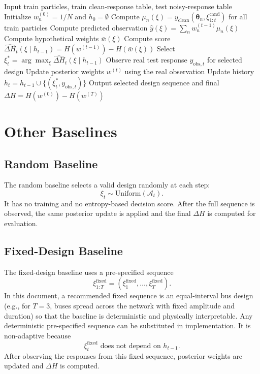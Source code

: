\documentclass[11pt]{article}
\newcommand{\thetaVec}{\bm{\theta}}
\newcommand{\Aset}{\mathcal{A}}
\begin{document}
\begin{algorithm}[H]
\caption{Myopic Entropy-Reduction Baseline}
\begin{algorithmic}[1]
\State Input train particles, train clean-response table, test noisy-response table
\State Initialize $w_n^{(0)}=1/N$ and $h_0=\emptyset$
    \For{each feasible candidate design $\xi\in\Aset_t$}
        \State Compute $\mu_n(\xi)=y_{\mathrm{clean}}(\thetaVec_n,\xi_{1:t}^{\mathrm{cand}})$ for all train particles
        \State Compute predicted observation $\hat y(\xi)=\sum_n w_n^{(t-1)}\mu_n(\xi)$
        \State Compute hypothetical weights $\bar w(\xi)$
        \State Compute score $\widehat{\Delta H}_t(\xi\mid h_{t-1})=H(w^{(t-1)})-H(\bar w(\xi))$
    \EndFor
    \State Select $\xi_t^*=\arg\max_{\xi}\widehat{\Delta H}_t(\xi\mid h_{t-1})$
    \State Observe real test response $y_{\mathrm{obs},t}$ for selected design
    \State Update posterior weights $w^{(t)}$ using the real observation
    \State Update history $h_t=h_{t-1}\cup\{(\xi_t^*,y_{\mathrm{obs},t})\}$
\EndFor
\State Output selected design sequence and final $\Delta H=H(w^{(0)})-H(w^{(T)})$
\end{algorithmic}
\end{algorithm}

\section{Other Baselines}

\subsection{Random Baseline}

The random baseline selects a valid design randomly at each step:
\begin{equation}
 \xi_t\sim \mathrm{Uniform}(\Aset_t).
\end{equation}
It has no training and no entropy-based decision score. After the full sequence is observed, the same posterior update is applied and the final $\Delta H$ is computed for evaluation.

\subsection{Fixed-Design Baseline}

The fixed-design baseline uses a pre-specified sequence
\begin{equation}
 \xi_{1:T}^{\mathrm{fixed}}
 =
 (\xi_1^{\mathrm{fixed}},\ldots,\xi_T^{\mathrm{fixed}}).
\end{equation}
In this document, a recommended fixed sequence is an equal-interval bus design (e.g., for $T=3$, buses spread across the network with fixed amplitude and duration) so that the baseline is deterministic and physically interpretable. Any deterministic pre-specified sequence can be substituted in implementation.
It is non-adaptive because
\begin{equation}
 \xi_t^{\mathrm{fixed}}
 \text{ does not depend on } h_{t-1}.
\end{equation}
After observing the responses from this fixed sequence, posterior weights are updated and $\Delta H$ is computed.
\end{document}
